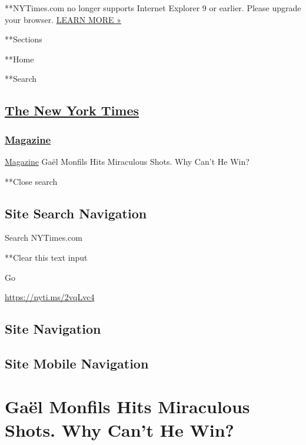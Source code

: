  **NYTimes.com no longer supports Internet Explorer 9 or earlier. Please
upgrade your browser.
\href{http://www.nytimes3xbfgragh.onion/content/help/site/ie9-support.html}{LEARN
MORE »}

**Sections

**Home

**Search

\hypertarget{the-new-york-times}{%
\subsection{\texorpdfstring{\href{http://www.nytimes3xbfgragh.onion/}{The
New York Times}}{The New York Times}}\label{the-new-york-times}}

\hypertarget{-magazine-}{%
\subsubsection{\texorpdfstring{
\href{https://www.nytimes3xbfgragh.onion/section/magazine}{Magazine}
}{ Magazine }}\label{-magazine-}}

 \href{https://www.nytimes3xbfgragh.onion/section/magazine}{Magazine}
\textbar{}Gaël Monfils Hits Miraculous Shots. Why Can't He Win?

**Close search

\hypertarget{site-search-navigation}{%
\subsection{Site Search Navigation}\label{site-search-navigation}}

Search NYTimes.com

**Clear this text input

Go

\url{https://nyti.ms/2vqLvc4}

\hypertarget{site-navigation}{%
\subsection{Site Navigation}\label{site-navigation}}

\hypertarget{site-mobile-navigation}{%
\subsection{Site Mobile Navigation}\label{site-mobile-navigation}}

\hypertarget{gauxebl-monfils-hits-miraculous-shots-why-cant-he-win}{%
\section{Gaël Monfils Hits Miraculous Shots. Why Can't He
Win?}\label{gauxebl-monfils-hits-miraculous-shots-why-cant-he-win}}

